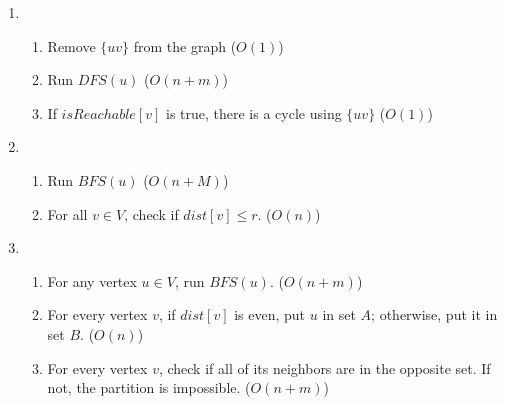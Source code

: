 \documentclass[11pt]{article}
\begin{document}
\begin{enumerate}
    \item 
    \begin{enumerate}
        \item Remove $\{uv\}$ from the graph ($O(1)$)
        \item Run $DFS(u)$ ($O(n + m)$)
        \item If $isReachable[v]$ is true, there is a cycle using $\{uv\}$ ($O(1)$)
    \end{enumerate}
    \item 
    \begin{enumerate}
        \item Run $BFS(u)$ ($O(n + M)$)
        \item For all $v \in V$, check if $dist[v] \leq r$. ($O(n)$)
    \end{enumerate}
    \item 
    \begin{enumerate}
        \item For any vertex $u \in V$, run $BFS(u)$. ($O(n + m)$)
        \item For every vertex $v$, if $dist[v]$ is even, put $u$ in set $A$; otherwise, put it in set $B$. ($O(n)$)
        \item For every vertex $v$, check if all of its neighbors are in the opposite set. If not, the partition is impossible. ($O(n + m)$)
    \end{enumerate}
\end{enumerate}
\end{document}
